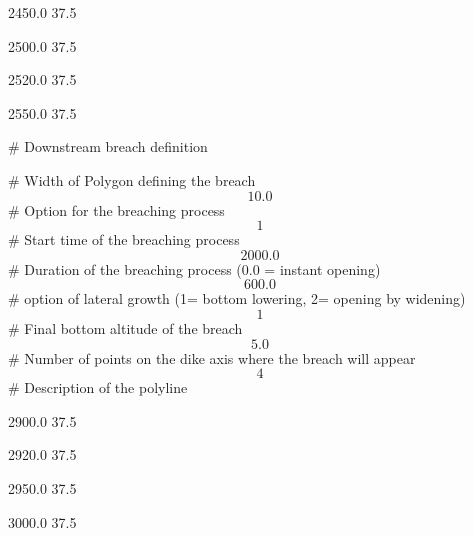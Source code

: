  2450.0 37.5

 2500.0 37.5

 2520.0 37.5

 2550.0 37.5

 \# Downstream breach definition

 \# Width of Polygon defining the breach
\[10.0\]
\# Option for the breaching process
\[1\]
\# Start time of the breaching process
\[2000.0\]
\# Duration of the breaching process (0.0 = instant opening)
\[600.0\]
\# option of lateral growth (1= bottom lowering, 2= opening by widening)
\[1\]
\# Final bottom altitude of the breach
\[5.0\]
\# Number of points on the dike axis where the breach will appear
\[4\]
\# Description of the polyline

 2900.0 37.5

 2920.0 37.5

 2950.0 37.5

 3000.0 37.5
